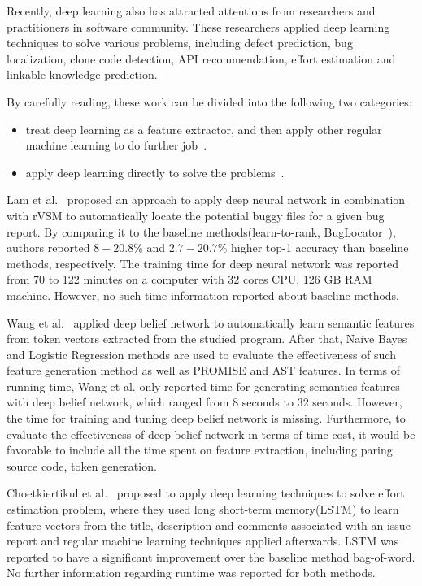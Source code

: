 \documentclass[sigconf,review, anonymous]{acmart}
\theoremstyle{break}
\newcommand{\bi}{\begin{itemize}[leftmargin=0.4cm]}
\newcommand{\ei}{\end{itemize}}
\begin{document}
Recently, deep learning also has attracted  attentions from researchers and practitioners in software
 community\cite{wang2016automatically, gu2016deep, xu2016predicting,white2016deep,white2015toward,lam2015combining,choetkiertikul2016deep,yuan2014droid}.
 These researchers applied  deep learning techniques to solve various problems,
 including defect prediction, bug localization, clone code detection, API recommendation, 
 effort estimation and linkable knowledge prediction.
 
By carefully reading, these work can be divided into the following two categories:
 
\bi
\item treat deep learning as a feature extractor, and then apply other regular machine learning to do further job~\cite{lam2015combining,wang2016automatically,choetkiertikul2016deep}.
\item apply deep learning directly to solve the problems~\cite{gu2016deep,xu2016predicting,white2016deep,white2015toward,yuan2014droid}.
\ei

Lam et al.~\cite{lam2015combining}  proposed an approach to apply deep neural network
 in combination with rVSM to automatically locate the potential buggy files for a given
 bug report. By comparing it to the baseline methods(learn-to-rank\cite{ye2014learning}, 
 BugLocator~\cite{zhou2012should}), authors reported $8-20.8\%$  and $2.7-20.7\%$ 
 higher top-1 accuracy than baseline methods, respectively. The training time for deep neural
 network was reported from 70 to 122 minutes on a computer with 32 cores CPU,
 126 GB RAM machine. However,
 no such time information reported about baseline methods.
 
 Wang et al.~\cite{wang2016automatically} applied deep belief network to automatically
 learn semantic features from token vectors extracted from the studied program. After
 that, Naive Bayes and Logistic Regression methods are used to evaluate the effectiveness
 of such feature generation method as well as PROMISE and AST features. In terms of
 running time, Wang et al. only reported time for generating semantics features with deep belief network, which
 ranged from 8 seconds to 32 seconds. However, the time for training and tuning deep belief network is
 missing. Furthermore, to evaluate the effectiveness of deep belief network in terms of time cost, 
 it would be favorable to include all the time spent on feature extraction, including
 paring source code, token generation.
 
 Choetkiertikul et al.~\cite{choetkiertikul2016deep} proposed to apply deep learning techniques
 to solve effort estimation problem, where they used long short-term memory(LSTM) to learn
 feature vectors from the title, description and comments associated with an issue report and
 regular machine learning techniques applied afterwards. LSTM was reported to have a 
 significant improvement over the baseline method bag-of-word. No further information regarding
 runtime was reported for both methods.
 
\end{document}
